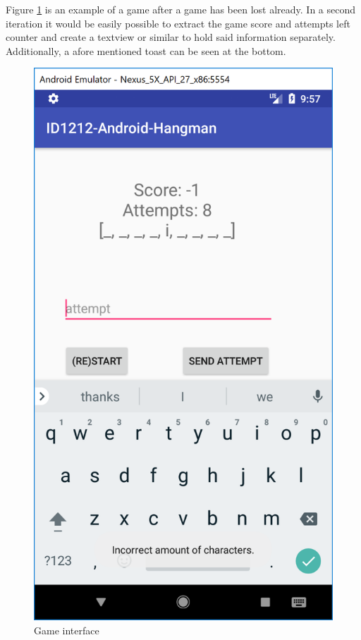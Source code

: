 \documentclass[a4paper]{scrartcl}
\begin{document}
Figure \ref{fig:a2} is an example of a game after a game has been lost already.
In a second iteration it would be easily possible to extract the game score and attempts left counter and create a textview or similar to hold said information separately. Additionally, a afore mentioned toast can be seen at the bottom.

\begin{figure}[h!]
  \begin{center}
    \includegraphics[scale=0.5]{Activity2.png}
    \caption{Game interface}
    \label{fig:a2}
  \end{center}
\end{figure}
\end{document}
